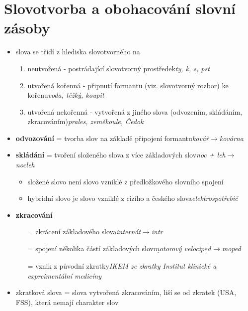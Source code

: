\documentclass{memoir}
\begin{document}
\section*{Slovotvorba a obohacování slovní zásoby}
	\begin{itemize}
		\item slova se třídí z hlediska slovotvorného na
		\begin{enumerate}
			\item neutvořená - postrádající slovotvorný prostředek\hfill\textit{ty, k, s, pst}
			\item utvořená kořenná - připnutí formantu (viz. slovotvorný rozbor) ke kořenu\hfill\textit{voda, těžký, koupit}
			\item utvořená nekořenná - vytvořená z jiného slova (odvozením, skládáním, zkracováním)\hfill\textit{prales, zeměkoule, Čedok}
		\end{enumerate}
		\item \textbf{odvozování} = tvorba slov na základě připojení formantu\hfill\textit{kovář$\rightarrow$kovárna}
		\item \textbf{skládání} = tvoření složeného slova z více základových slov\hfill\textit{noc + leh$\rightarrow$nocleh}
		\begin{itemize}
			\item složené slovo není slovo vzniklé z předložkového slovního spojení
			\item hybridní slovo je slovo vzniklé z cizího a českého slova\hfill\textit{elektrospotřebič}
		\end{itemize}
		\item \textbf{zkracování} 
		\begin{itemize}
			\item[=] zkrácení základového slova\hfill\textit{internát$\rightarrow$intr}
			\item[=] spojení několika částí základových slov\hfill\textit{$\underline{mo}$torový veloci$\underline{ped}$$\rightarrow$moped}
			\item[=] vznik z původní zkratky\hfill\textit{IKEM ze zkratky Institut klinické a expreimentální medicíny}
		\end{itemize}
		\item zkratková slova = slova vytvořená zkracováním, liší se od zkratek (USA, FSS), která nemají charakter slov\\
	\end{itemize}
\end{document}
